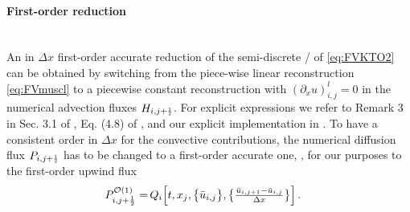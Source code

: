 \paragraph{First-order reduction}\label{paragraph:KTO1}\mbox{} \\
An in $\Delta x$ first-order accurate reduction of the semi-discrete \kt{}/\knpScheme{} of \cref{eq:FVKTO2} can be obtained by switching from the piece-wise linear \muscl{} reconstruction \eqref{eq:FVmuscl} to a piecewise constant reconstruction with $(\partial_x u )_{i,j}^l=0$ in the numerical advection fluxes $H_{i,j + \ttfrac{1}{2}}$. 
For explicit expressions we refer to Remark 3 in Sec. 3.1 of , Eq. (4.8) of , and our explicit implementation in .
To have a consistent order in $\Delta x$ for the convective contributions, the numerical diffusion flux $P_{i,j + \ttfrac{1}{2}}$ has to be changed to a first-order accurate one, \ie{}, for our purposes to the first-order upwind flux
\begin{align}
	 P_{i,j + \frac{1}{2}}^{\mathcal{O}(1)} = \, & Q_i \Big[ t, x_j, \big\{\bar{u}_{i,j}\big\},  \big\{\tfrac{\bar{u}_{i,j + 1} - \bar{u}_{i,j}}{\Delta x} \big\}\Big] \, .	\label{eq:kt_original_diffusion_O1}
\end{align}

